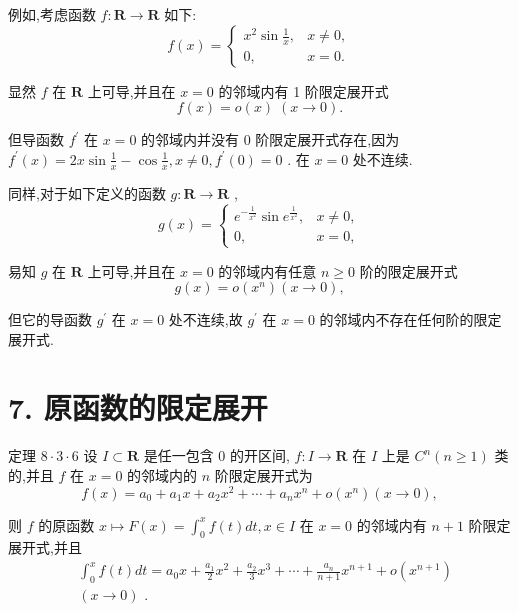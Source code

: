 例如,考虑函数 $f : \mathbf{R} \rightarrow  \mathbf{R}$ 如下:
$$f\left( x\right)  = \left\{  \begin{array}{ll} {x}^{2}\sin \frac{1}{x}, & x \neq  0, \\  0, & x = 0. \end{array}\right.$$

显然 $f$ 在 $\mathbf{R}$ 上可导,并且在 $x = 0$ 的邻域内有 1 阶限定展开式
$$f\left( x\right)  = o\left( x\right) \;\left( {x \rightarrow  0}\right) .$$

但导函数 ${f}^{\prime }$ 在 $x = 0$ 的邻域内并没有 0 阶限定展开式存在,因为 ${f}^{\prime }\left( x\right)  = {2x}\sin \frac{1}{x} - \cos \frac{1}{x},x \neq  0,{f}^{\prime }\left( 0\right)  = 0$ . 在 $x = 0$ 处不连续.

同样,对于如下定义的函数 $g : \mathbf{R} \rightarrow  \mathbf{R}$ ,
$$g\left( x\right)  = \left\{  \begin{array}{ll} {e}^{-\frac{1}{{x}^{2}}}\sin {e}^{\frac{1}{{x}^{2}}}, & x \neq  0, \\  0, & x = 0, \end{array}\right.$$

易知 $g$ 在 $\mathbf{R}$ 上可导,并且在 $x = 0$ 的邻域内有任意 $n \geq  0$ 阶的限定展开式
$$g\left( x\right)  = o\left( {x}^{n}\right) \left( {x \rightarrow  0}\right) ,$$

但它的导函数 ${g}^{\prime }$ 在 $x = 0$ 处不连续,故 ${g}^{\prime }$ 在 $x = 0$ 的邻域内不存在任何阶的限定展开式.

\section*{7. 原函数的限定展开}

定理 $8 \cdot  3 \cdot  6$ 设 $I \subset  \mathbf{R}$ 是任一包含 0 的开区间, $f : I \rightarrow  \mathbf{R}$ 在 $I$ 上是 ${C}^{n}\left( {n \geq  1}\right)$ 类的,并且 $f$ 在 $x = 0$ 的邻域内的 $n$ 阶限定展开式为
$$f\left( x\right)  = {a}_{0} + {a}_{1}x + {a}_{2}{x}^{2} + \cdots  + {a}_{n}{x}^{n} + o\left( {x}^{n}\right) \left( {x \rightarrow  0}\right) ,$$

则 $f$ 的原函数 $x \mapsto  F\left( x\right)  = {\int }_{0}^{x}f\left( t\right) {dt},x \in  I$ 在 $x = 0$ 的邻域内有 $n + 1$ 阶限定展开式,并且
\begin{align*}
	&{\int }_{0}^{x}f\left( t\right) {dt} = {a}_{0}x + \frac{{a}_{1}}{2}{x}^{2} + \frac{{a}_{2}}{3}{x}^{3} + \cdots  + \frac{{a}_{n}}{n + 1}{x}^{n + 1} + o\left( {x}^{n + 1}\right)\\
	&\left( {x \rightarrow  0}\right) \text{ . }
\end{align*}

